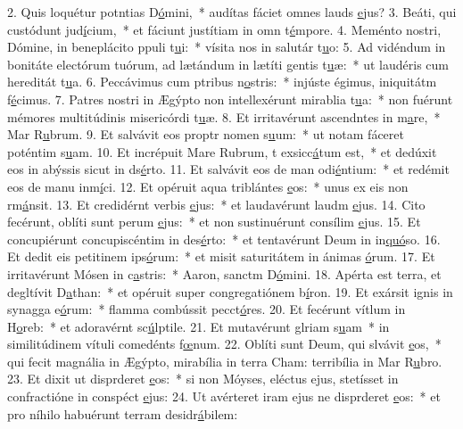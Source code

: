 2. Quis loquétur potntias D\uline{ó}mini,~* audítas fáciet omnes lauds \uline{e}jus?
3. Beáti, qui custódunt jud\uline{í}cium,~* et fáciunt justítiam in omn t\uline{é}mpore.
4. Meménto nostri, Dómine, in beneplácito ppuli t\uline{u}i:~* vísita nos in salutár t\uline{u}o:
5. Ad vidéndum in bonitáte electórum tuórum, ad lætándum in lætíti gentis t\uline{u}æ:~* ut laudéris cum hereditát t\uline{u}a.
6. Peccávimus cum ptribus n\uline{o}stris:~* injúste égimus, iniquitátm f\uline{é}cimus.
7. Patres nostri in Ægýpto non intellexérunt mirablia t\uline{u}a:~* non fuérunt mémores multitúdinis misericórdi t\uline{u}æ.
8. Et irritavérunt ascendntes in m\uline{a}re,~* Mar R\uline{u}brum.
9. Et salvávit eos proptr nomen s\uline{u}um:~* ut notam fáceret poténtim s\uline{u}am.
10. Et incrépuit Mare Rubrum, t exsicc\uline{á}tum est,~* et dedúxit eos in abýssis sicut in ds\uline{é}rto.
11. Et salvávit eos de man odi\uline{é}ntium:~* et redémit eos de manu inm\uline{í}ci.
12. Et opéruit aqua triblántes \uline{e}os:~* unus ex eis non rm\uline{á}nsit.
13. Et credidérnt verbis \uline{e}jus:~* et laudavérunt laudm \uline{e}jus.
14. Cito fecérunt, oblíti sunt perum \uline{e}jus:~* et non sustinuérunt consílim \uline{e}jus.
15. Et concupiérunt concupiscéntim in des\uline{é}rto:~* et tentavérunt Deum in in\uline{quó}so.
16. Et dedit eis petitinem ips\uline{ó}rum:~* et misit saturitátem in ánimas \uline{ó}rum.
17. Et irritavérunt Mósen in c\uline{a}stris:~* Aaron, sanctm D\uline{ó}mini.
18. Apérta est terra, et degltívit D\uline{a}than:~* et opéruit super congregatiónem b\uline{í}ron.
19. Et exársit ignis in synagga e\uline{ó}rum:~* flamma combússit pecct\uline{ó}res.
20. Et fecérunt vítlum in H\uline{o}reb:~* et adoravérnt sc\uline{ú}lptile.
21. Et mutavérunt glriam s\uline{u}am~* in similitúdinem vítuli comedénts f\uline{œ}num.
22. Oblíti sunt Deum, qui slvávit \uline{e}os,~* qui fecit magnália in Ægýpto, mirabília in terra Cham: terribília in Mar R\uline{u}bro.
23. Et dixit ut disprderet \uline{e}os:~* si non Móyses, eléctus ejus, stetísset in confractióne in conspéct \uline{e}jus:
24. Ut avérteret iram ejus ne disprderet \uline{e}os:~* et pro níhilo habuérunt terram desidr\uline{á}bilem:
